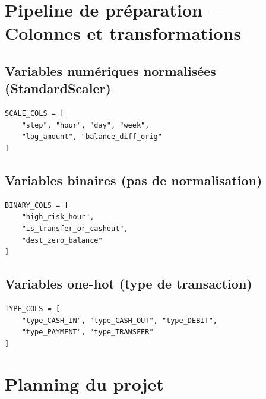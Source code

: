 \documentclass[12pt,a4paper,twoside]{report}
\begin{document}
\chapter{Pipeline de préparation --- Colonnes et transformations}

\section{Variables numériques normalisées (StandardScaler)}

\begin{lstlisting}[label={lst:scale_cols}]
SCALE_COLS = [
    "step", "hour", "day", "week",
    "log_amount", "balance_diff_orig"
]
\end{lstlisting}

\section{Variables binaires (pas de normalisation)}

\begin{lstlisting}[label={lst:binary_cols}]
BINARY_COLS = [
    "high_risk_hour",
    "is_transfer_or_cashout",
    "dest_zero_balance"
]
\end{lstlisting}

\section{Variables one-hot (type de transaction)}

\begin{lstlisting}[label={lst:type_cols}]
TYPE_COLS = [
    "type_CASH_IN", "type_CASH_OUT", "type_DEBIT",
    "type_PAYMENT", "type_TRANSFER"
]
\end{lstlisting}

\chapter{Planning du projet}
\end{document}
